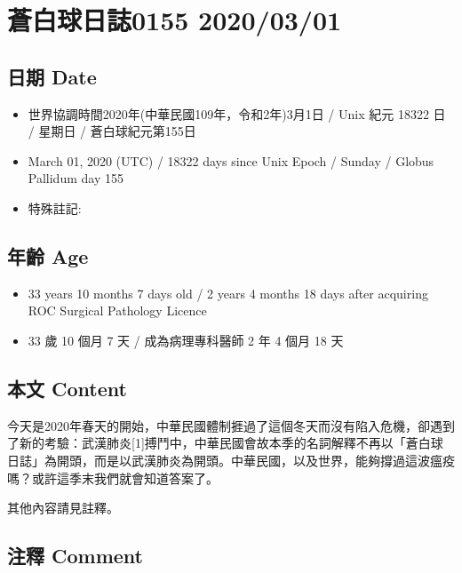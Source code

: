 \documentclass[
]{article}
\date{}
\providecommand{\tightlist}{%
  \setlength{\itemsep}{0pt}\setlength{\parskip}{0pt}}
\begin{document}
\hypertarget{ux84bcux767dux7403ux65e5ux8a8c0155-20200301}{%
\section{蒼白球日誌0155
2020/03/01}\label{ux84bcux767dux7403ux65e5ux8a8c0155-20200301}}

\hypertarget{ux65e5ux671f-date}{%
\subsection{日期 Date}\label{ux65e5ux671f-date}}

\begin{itemize}
\tightlist
\item
  世界協調時間2020年(中華民國109年，令和2年)3月1日 / Unix 紀元 18322 日
  / 星期日 / 蒼白球紀元第155日
\item
  March 01, 2020 (UTC) / 18322 days since Unix Epoch / Sunday / Globus
  Pallidum day 155
\item
  特殊註記:
\end{itemize}

\hypertarget{ux5e74ux9f61-age}{%
\subsection{年齡 Age}\label{ux5e74ux9f61-age}}

\begin{itemize}
\tightlist
\item
  33 years 10 months 7 days old / 2 years 4 months 18 days after
  acquiring ROC Surgical Pathology Licence
\item
  33 歲 10 個月 7 天 / 成為病理專科醫師 2 年 4 個月 18 天
\end{itemize}

\hypertarget{ux672cux6587-content}{%
\subsection{本文 Content}\label{ux672cux6587-content}}

今天是2020年春天的開始，中華民國體制捱過了這個冬天而沒有陷入危機，卻遇到了新的考驗：武漢肺炎{[}1{]}搏鬥中，中華民國會故本季的名詞解釋不再以「蒼白球日誌」為開頭，而是以武漢肺炎為開頭。中華民國，以及世界，能夠撐過這波瘟疫嗎？或許這季末我們就會知道答案了。

其他內容請見註釋。

\hypertarget{ux6ce8ux91cb-comment}{%
\subsection{注釋 Comment}\label{ux6ce8ux91cb-comment}}
\end{document}
